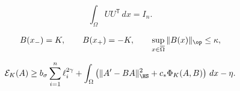 \[
                  \int_\Omega UU^{\mathsf T}\,dx=I_n.
\]

\[
 B(x_-)=K,\qquad B(x_+)=-K,\qquad
 \sup_{x\in\overline\Omega}\|B(x)\|_{\op}\leq\kappa,
\]

\begin{equation}\label{act:bound}
 \mathcal E_K(A)\geq b_\sigma\sum_{i=1}^n\ell_i^{2\gamma}
   +\int_\Omega\left(\|A'-BA\|_{\HS}^2
                        +c_*\Phi_K(A,B)\right)\,dx-\eta.
\end{equation}

